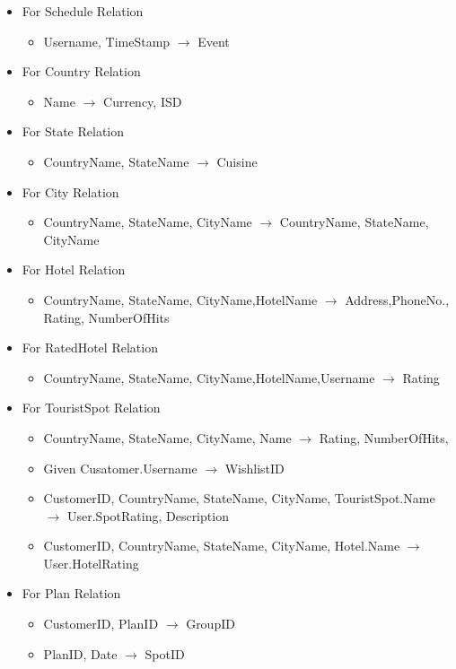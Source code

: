 \documentclass[a4paper,11pt]{article}
\begin{document}
\begin{itemize}
\item For Schedule Relation
\begin{itemize}
\item Username, TimeStamp $\rightarrow$ Event
\end{itemize}
\item For Country Relation
\begin{itemize}
\item Name $\rightarrow$ Currency, ISD
\end{itemize}
\item For State Relation
\begin{itemize}
\item CountryName, StateName $\rightarrow$ Cuisine
\end{itemize}
\item For City Relation
\begin{itemize}
\item CountryName, StateName, CityName $\rightarrow$ CountryName, StateName, CityName 
\end{itemize}
\item For Hotel Relation
\begin{itemize}
\item CountryName, StateName, CityName,HotelName $\rightarrow$ Address,PhoneNo., Rating, NumberOfHits 
\end{itemize}
\item For RatedHotel Relation
\begin{itemize}
\item CountryName, StateName, CityName,HotelName,Username $\rightarrow$ Rating
\end{itemize}
\item For TouristSpot Relation
\begin{itemize}
\item CountryName, StateName, CityName, Name $\rightarrow$ Rating, NumberOfHits,
\item Given Cusatomer.Username $\rightarrow$ WishlistID
\item CustomerID, CountryName, StateName, CityName, TouristSpot.Name $\rightarrow$ User.SpotRating, Description
\item CustomerID, CountryName, StateName, CityName, Hotel.Name $\rightarrow$ User.HotelRating
\end{itemize}
\item For Plan Relation
\begin{itemize}
\item CustomerID, PlanID $\rightarrow$ GroupID
\item PlanID, Date $\rightarrow$ SpotID
\end{itemize}
\end{itemize}
\end{document}
